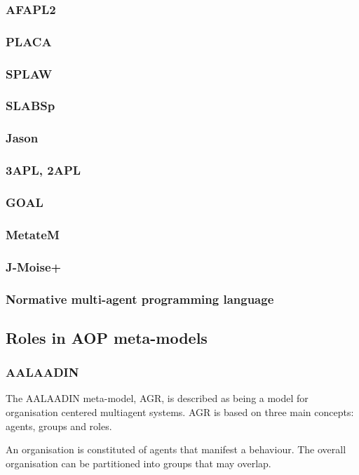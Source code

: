 \documentclass{article}
\begin{document}
\subsubsection{AFAPL2}
\subsubsection{PLACA}
\subsubsection{SPLAW}
\subsubsection{SLABSp}
\subsubsection{Jason}
\subsubsection{3APL, 2APL}
\subsubsection{GOAL}
\subsubsection{MetateM}
\subsubsection{J-Moise+}
\subsubsection{Normative multi-agent programming language}

\subsection{Roles in AOP meta-models}

\subsubsection{AALAADIN} The AALAADIN meta-model, AGR, is described
as being a model for organisation centered multiagent systems.
AGR is based on three main concepts: agents, groups and roles.

An organisation is constituted of agents that manifest a behaviour.
The overall organisation can be partitioned into groups that may
overlap. 
\end{document}
